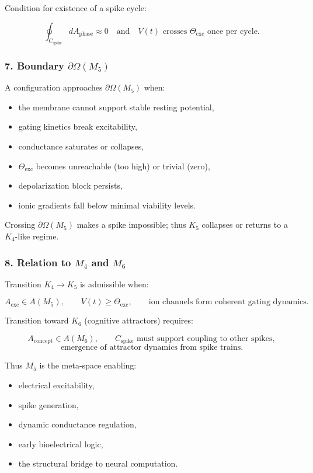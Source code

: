 Condition for existence of a spike cycle:

\[
\oint_{C_{\mathrm{spike}}} dA_{\mathrm{phase}} \approx 0
\quad\text{and}\quad
V(t) \text{ crosses } \Theta_{\mathrm{exc}} \text{ once per cycle}.
\]

\subsubsection*{7. Boundary \texorpdfstring{$\partial\Omega(M_5)$}{\partial\Omega(M_5)}}

A configuration approaches $\partial\Omega(M_5)$ when:

\begin{itemize}
    \item the membrane cannot support stable resting potential,
    \item gating kinetics break excitability,
    \item conductance saturates or collapses,
    \item $\Theta_{\mathrm{exc}}$ becomes unreachable (too high) or trivial (zero),
    \item depolarization block persists,
    \item ionic gradients fall below minimal viability levels.
\end{itemize}

Crossing $\partial\Omega(M_5)$ makes a spike impossible;
thus $K_5$ collapses or returns to a $K_4$-like regime.

\subsubsection*{8. Relation to \texorpdfstring{$M_4$}{M_4} and \texorpdfstring{$M_6$}{M_6}}

Transition $K_4 \to K_5$ is admissible when:

\[
A_{\mathrm{exc}} \in A(M_5),
\qquad
V(t) \ge \Theta_{\mathrm{exc}},
\qquad
\text{ion channels form coherent gating dynamics}.
\]

Transition toward $K_6$ (cognitive attractors) requires:

\[
A_{\mathrm{concept}} \in A(M_6),
\qquad
C_{\mathrm{spike}} \text{ must support coupling to other spikes},
\]
\[
\text{emergence of attractor dynamics from spike trains}.
\]

Thus $M_5$ is the meta-space enabling:

\begin{itemize}
    \item electrical excitability,
    \item spike generation,
    \item dynamic conductance regulation,
    \item early bioelectrical logic,
    \item the structural bridge to neural computation.
\end{itemize}
